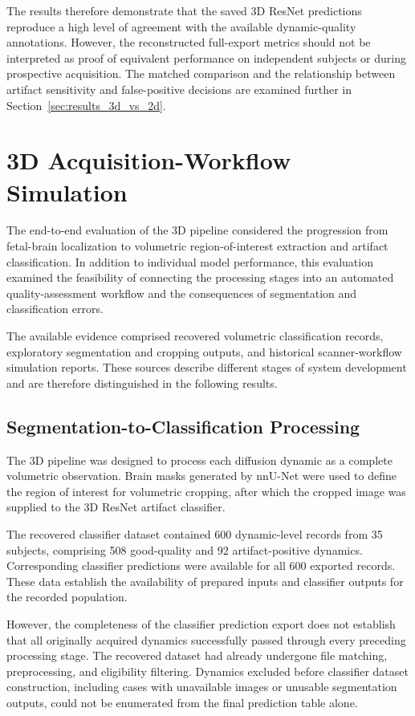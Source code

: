 The results therefore demonstrate that the saved 3D ResNet predictions reproduce a high level of agreement with the available dynamic-quality annotations. However, the reconstructed full-export metrics should not be interpreted as proof of equivalent performance on independent subjects or during prospective acquisition. The matched comparison and the relationship between artifact sensitivity and false-positive decisions are examined further in Section~\ref{sec:results_3d_vs_2d}.

\section{3D Acquisition-Workflow Simulation}
\label{sec:results_3d_end_to_end}

The end-to-end evaluation of the 3D pipeline considered the progression from fetal-brain localization to volumetric region-of-interest extraction and artifact classification. In addition to individual model performance, this evaluation examined the feasibility of connecting the processing stages into an automated quality-assessment workflow and the consequences of segmentation and classification errors.

The available evidence comprised recovered volumetric classification records, exploratory segmentation and cropping outputs, and historical scanner-workflow simulation reports. These sources describe different stages of system development and are therefore distinguished in the following results.

\subsection{Segmentation-to-Classification Processing}
\label{subsec:results_3d_processing}

The 3D pipeline was designed to process each diffusion dynamic as a complete volumetric observation. Brain masks generated by nnU-Net were used to define the region of interest for volumetric cropping, after which the cropped image was supplied to the 3D ResNet artifact classifier.

The recovered classifier dataset contained 600 dynamic-level records from 35 subjects, comprising 508 good-quality and 92 artifact-positive dynamics. Corresponding classifier predictions were available for all 600 exported records. These data establish the availability of prepared inputs and classifier outputs for the recorded population.

However, the completeness of the classifier prediction export does not establish that all originally acquired dynamics successfully passed through every preceding processing stage. The recovered dataset had already undergone file matching, preprocessing, and eligibility filtering. Dynamics excluded before classifier dataset construction, including cases with unavailable images or unusable segmentation outputs, could not be enumerated from the final prediction table alone.


